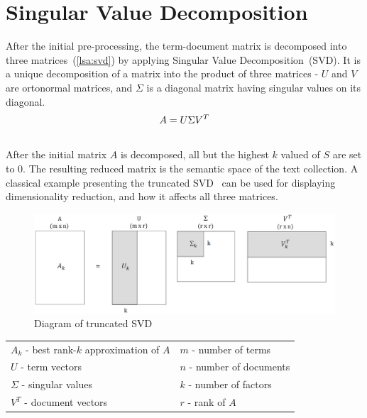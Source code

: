 \section{Singular Value Decomposition}
\label{sec:lsa:svd}

After the initial pre-processing, the term-document matrix is decomposed into three matrices~(\ref{lsa:svd}) by applying Singular Value Decomposition~(\gls{SVD}). It is a unique decomposition of a matrix into the product of three matrices - $U$ and $V$ are ortonormal matrices, and $ \Sigma $ is a diagonal matrix having singular values on its diagonal.\\
%
%
\begin{equation}
\label{lsa:svd}
A=U \Sigma V^{T}\\
\end{equation}\\

After the initial matrix $A$ is decomposed, all but the highest $k$ valued of $S$ are set to $0$. The resulting reduced matrix is the semantic space of the text collection. A classical example presenting the truncated \gls{SVD}~\cite{Dumais88usingLSA}  can be used for displaying dimensionality reduction, and how it affects all three matrices.\\
%
%
\begin{center}
\begin{figure}[htbp]
\label{lsa:truncated_svd}
	\centering
	\includegraphics[width=\ScaleIfNeeded]{img/svd} 
	\caption[Diagram of truncated SVD]%
           {Diagram of truncated SVD}
\end{figure}
%
%
\begin{tabular}{l l}
$A_{k}$ - best rank-$k$ approximation of $A$ & $m$ - number of terms\\
$U$ - term vectors & $n$ - number of documents \\
$\Sigma$ - singular values & $k$ - number of factors \\
$V^{T}$ - document vectors & $r$ - rank of $A$ \\
\end{tabular}
\end{center} 


